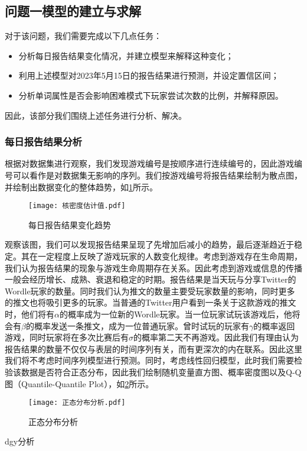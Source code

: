 \documentclass{MathModeling}
\begin{document}
	\subsection{问题一模型的建立与求解}
	对于该问题，我们需要完成以下几点任务：
	\begin{itemize}
		\item 分析每日报告结果变化情况，并建立模型来解释这种变化；
		\item 利用上述模型对2023年5月15日的报告结果进行预测，并设定置信区间；
		\item 分析单词属性是否会影响困难模式下玩家尝试次数的比例，并解释原因。
	\end{itemize}
	因此，该部分我们围绕上述任务进行分析、解决。
	\subsubsection{每日报告结果分析}
	根据对数据集进行观察，我们发现游戏编号是按顺序进行连续编号的，因此游戏编号可以看作是对数据集无影响的序列。我们按游戏编号将报告结果绘制为散点图，并绘制出数据变化的整体趋势，如\textcolor{blue}{\cref{fig:每日报告结果变化趋势}}所示。
	\begin{figure}[H]
		\centering
		\texttt{[image: 核密度估计值.pdf]}
		\caption{每日报告结果变化趋势}
		\label{fig:每日报告结果变化趋势}
	\end{figure}
	观察该图，我们可以发现报告结果呈现了先增加后减小的趋势，最后逐渐趋近于稳定。其在一定程度上反映了游戏玩家的人数变化规律。考虑到游戏存在生命周期，我们认为报告结果的现象与游戏生命周期存在关系。因此考虑到游戏或信息的传播一般会经历增长、成熟、衰退和稳定的时期。报告结果是当天玩与分享Twitter的Wordle玩家的数量。同时我们认为推文的数量主要受玩家数量的影响，同时更多的推文也将吸引更多的玩家。当普通的Twitter用户看到一条关于这款游戏的推文时，他们将有$\alpha$的概率成为一位新的Wordle玩家。当一位玩家试玩该游戏后，他将会有$\beta$的概率发送一条推文，成为一位普通玩家。曾时试玩的玩家有$\gamma$的概率返回游戏，同时玩家将在多次比赛后有$\sigma$的概率第二天不再游戏。因此我们有理由认为报告结果的数量不仅仅与表层的时间序列有关，而有更深次的内在联系。因此这里我们将不考虑时间序列模型进行预测。同时，考虑线性回归模型，此时我们需要检验该数据是否符合正态分布，因此我们绘制随机变量直方图、概率密度图以及Q-Q图（Quantile-Quantile Plot），如\textcolor{blue}{\cref{fig:正态分布分析}}所示。
	\begin{figure}[H]
		\centering
		\texttt{[image: 正态分布分析.pdf]}
		\caption{正态分布分析}
		\label{fig:正态分布分析}
	\end{figure}
dgy分析
\end{document}
